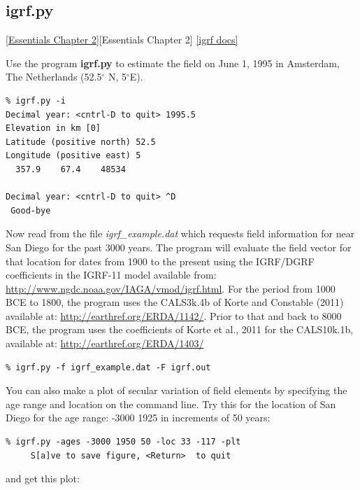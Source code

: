 \documentclass[11pt]{book}
\begin{document}
{{
\subsection{igrf.py}
\href{http://earthref.org/MAGIC/books/Tauxe/Essentials/WebBook3ch2.html#ch2}{[Essentials Chapter 2]}[Essentials Chapter 2]
\href{https://github.com/PmagPy/PmagPy/blob/master/programs/igrf.py}{[igrf docs]}

Use the program {\bf igrf.py } to estimate the
field on June 1, 1995 in Amsterdam, The Netherlands (52.5$^{\circ}$ N, 5$^{\circ}$E).

\begin{verbatim}
% igrf.py -i
Decimal year: <cntrl-D to quit> 1995.5
Elevation in km [0]
Latitude (positive north) 52.5
Longitude (positive east) 5
  357.9    67.4    48534

Decimal year: <cntrl-D to quit> ^D
 Good-bye
\end{verbatim}

Now read from the file {\it igrf\_example.dat} which requests field information for near San Diego for the past 3000 years.  The program will evaluate the field vector for that location for dates from 1900 to the present using the IGRF/DGRF coefficients in the IGRF-11 model available from:
\url{http://www.ngdc.noaa.gov/IAGA/vmod/igrf.html}.   For the period from 1000 BCE to 1800, the program uses the CALS3k.4b of Korte and Constable (2011) \nocite{korte11a} available at: \url{http://earthref.org/ERDA/1142/}.    Prior to that and back to 8000 BCE, the program uses the coefficients of Korte et al., 2011 \nocite{korte11b} for the CALS10k.1b, available at:
\url{http://earthref.org/ERDA/1403/}

\begin{verbatim}
% igrf.py -f igrf_example.dat -F igrf.out
\end{verbatim}

You can also make a plot of secular variation of field elements by specifying the age range and location on the command line.  Try this for the location of San Diego for the age range: -3000 1925 in increments of 50 years:

\begin{verbatim}
% igrf.py -ages -3000 1950 50 -loc 33 -117 -plt
     S[a]ve to save figure, <Return>  to quit
\end{verbatim}

and get this plot:


}}
\end{document}
